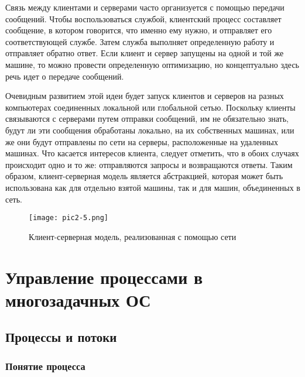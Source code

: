 Связь между клиентами и серверами часто организуется с помощью передачи сообщений. Чтобы воспользоваться службой, клиентский процесс составляет сообщение, в котором говорится, что именно ему нужно, и отправляет его соответствующей службе. Затем служба выполняет определенную работу и отправляет обратно ответ. Если клиент и сервер запущены на одной и той же машине, то можно провести определенную оптимизацию, но концептуально здесь речь идет о передаче сообщений.

Очевидным развитием этой идеи будет запуск клиентов и серверов на разных компьютерах соединенных локальной или глобальной сетью. Поскольку клиенты связываются с серверами путем отправки сообщений, им не обязательно знать, будут ли эти сообщения обработаны локально, на их собственных машинах, или же они будут отправлены по сети на серверы, расположенные на удаленных машинах. Что касается интересов клиента, следует отметить, что в обоих случаях происходит
одно и то же: отправляются запросы и возвращаются ответы. Таким образом, клиент-серверная модель является абстракцией, которая может быть использована как для отдельно взятой машины, так и для машин, объединенных в сеть.

\begin{figure}\center
   \texttt{[image: pic2-5.png]}
   \caption{Клиент-серверная модель, реализованная с помощью сети}
\end{figure}

\newpage
\chapter{Управление процессами в многозадачных ОС}

\section{Процессы и потоки}
\subsection{Понятие процесса}

